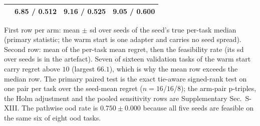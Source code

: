 \documentclass[journal]{IEEEtran}
\begin{document}
\begin{table}[t]
\begin{tabular}{@{}lccc@{}}
 & 6.85 / 0.512 & 9.16 / 0.525 & 9.05 / 0.600\\
\bottomrule\end{tabular}
\par\medskip
{\footnotesize First row per arm: mean $\pm$ sd over seeds of the seed's true
per-task median (primary statistic; the warm start is one adapter and carries no
seed spread).  Second row: mean of the per-task mean regret, then the
feasibility rate (its sd over seeds is in the artefact).  Seven of sixteen validation tasks of the warm start carry
regret above $10$ (largest $66.1$), which is why the mean row exceeds the median
row.  The primary paired test is the exact tie-aware signed-rank test on one pair per
task over the seed-mean regret ($n=16$/$16$/$8$); the arm-pair p-triples, the Holm
adjustment and the pooled sensitivity rows are Supplementary Sec.~S-XIII.  The pathwise ood rate is $0.750\pm0.000$ because all
five seeds are feasible on the same six of eight ood tasks.\par}
\end{table}
\end{document}

